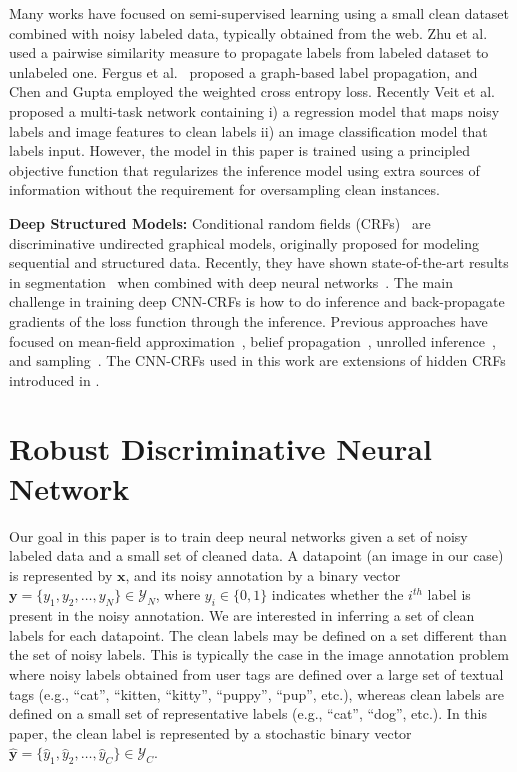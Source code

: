 \documentclass{article}
\newcommand{\x}{{\pmb{x}}}
\newcommand{\y}{{\pmb{y}}}
\newcommand{\yh}{{\hat{\pmb{y}}}}
\begin{document}
Many works have focused on semi-supervised learning using a small clean dataset combined with noisy labeled data, typically obtained from the web. 
Zhu et al.~\cite{ZhuLG03} used a pairwise similarity measure to propagate labels from labeled dataset to unlabeled one. 
Fergus et al.~\cite{fergusWT09} proposed a graph-based label propagation, and Chen and Gupta \cite{chen2015webly} employed the weighted cross entropy loss.
Recently Veit et al.~\cite{veit2017learning} proposed a multi-task network containing i) a regression model that maps noisy labels and image features to clean labels 
ii) an image classification model that labels input. 
However, the model in this paper is trained using a principled objective function that regularizes the inference model using extra sources of information without 
the requirement for oversampling clean instances.

\textbf{Deep Structured Models:} Conditional random fields (CRFs)~\cite{lafferty01CRF} are discriminative undirected graphical models, originally proposed for modeling sequential and structured data.
Recently, they have shown state-of-the-art results in segmentation~\cite{lin2016efficient, zheng2015conditional} when combined with deep neural 
networks~\cite{peng2009conditional, artieres2010neural, prabhavalkar2010backpropagation}. The main challenge in training
deep CNN-CRFs is how to do inference and back-propagate gradients of the loss function through the inference. Previous approaches have focused on mean-field
approximation~\cite{zheng2015conditional, krahenbuhl2011efficient},
belief propagation~\cite{chen2015learning, schwing2015fully}, unrolled inference~\cite{DengVHM16, ross2011learning}, and sampling~\cite{kirillov2015joint}. The CNN-CRFs used in this work
are extensions of hidden CRFs introduced in \cite{quattoni2007hidden, maaten2011hidden}.


\section{Robust Discriminative Neural Network}
Our goal in this paper is to train deep neural networks given a set of noisy labeled data and a small set of cleaned data.
A datapoint (an image in our case) is represented by $\x$, and its noisy annotation by a binary vector $\y = \{y_1, y_2, \dots, y_N \} \in \mathcal{Y}_N$, 
where $y_i \in \{0, 1\}$ indicates whether the $i^{th}$ label is present in the noisy annotation.
We are interested in inferring a set of clean labels for each datapoint. The clean labels may be defined on a set different than the set of noisy labels. 
This is typically the case in the image annotation problem where noisy labels obtained from user tags are defined over a large set of textual tags 
(e.g., ``cat'', ``kitten, ``kitty'', ``puppy'', ``pup'', etc.), whereas clean labels are defined on a small set of representative labels
(e.g., ``cat'', ``dog'', etc.). In this paper, the clean label is represented by a stochastic binary vector $\yh = \{\hat{y}_1, \hat{y}_2, \dots, \hat{y}_C \} \in \mathcal{Y}_C$.
\end{document}
